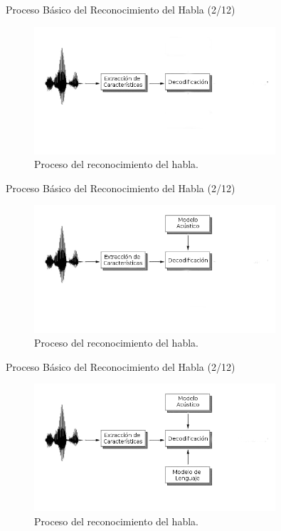 \begin{frame}{Proceso B\'asico del Reconocimiento del Habla (2/12)}

\begin{figure}[H]  
\centering
\includegraphics[width=0.8\textwidth]{./graphics/proceso_1.png}
\caption{Proceso del reconocimiento del habla.}
\label{figure:proceso}
\end{figure}
\end{frame}

\begin{frame}{Proceso B\'asico del Reconocimiento del Habla (2/12)}

\begin{figure}[H] 
\centering
\includegraphics[width=0.8\textwidth]{./graphics/proceso_2.png}
\caption{Proceso del reconocimiento del habla.}
\label{figure:proceso}
\end{figure}
\end{frame}

\begin{frame}{Proceso B\'asico del Reconocimiento del Habla (2/12)}

\begin{figure}[H] 
\centering
\includegraphics[width=0.8\textwidth]{./graphics/proceso_3.png}
\caption{Proceso del reconocimiento del habla.}
\label{figure:proceso}
\end{figure}
\end{frame}

